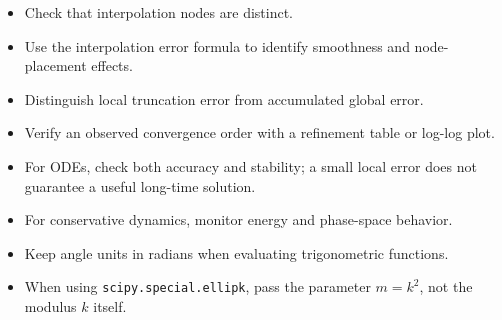 \documentclass[12pt, a4paper]{article}
\theoremstyle{break}
\providecommand{\tightlist}{\setlength{\itemsep}{0pt}\setlength{\parskip}{0pt}}
\providecommand{\passthrough}[1]{#1}
\begin{document}
\begin{itemize}
\tightlist
\item
  Check that interpolation nodes are distinct.
\item
  Use the interpolation error formula to identify smoothness and node-placement effects.
\item
  Distinguish local truncation error from accumulated global error.
\item
  Verify an observed convergence order with a refinement table or log-log plot.
\item
  For ODEs, check both accuracy and stability; a small local error does not guarantee a useful long-time solution.
\item
  For conservative dynamics, monitor energy and phase-space behavior.
\item
  Keep angle units in radians when evaluating trigonometric functions.
\item
  When using \passthrough{\lstinline!scipy.special.ellipk!}, pass the parameter \(m=k^2\), not the modulus \(k\) itself.
\end{itemize}
\end{document}
